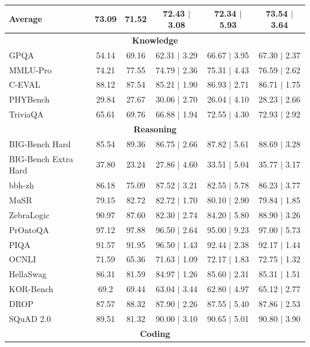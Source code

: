 \begin{table}[htbp]
{\begin{tabular}{lcc|ccc}
\midrule
\textbf{Average}& 73.09 & 71.52 & 72.43 $\mid$ 3.08 & 72.34 $\mid$ 5.93  & 73.54 $\mid$ 3.64 \\
\midrule
\multicolumn{6}{c}{\textbf{Knowledge}} \\
\midrule
GPQA & 54.14 & 69.16 & 62.31 $\mid$ 3.29 & 66.67 $\mid$ 3.95  & 67.30 $\mid$ 2.37 \\
MMLU-Pro & 74.21 & 77.55 & 74.79 $\mid$ 2.36 & 75.31 $\mid$ 4.43  & 76.59 $\mid$ 2.62 \\
C-EVAL & 88.12 & 87.54 & 85.21 $\mid$ 1.90 & 86.93 $\mid$ 2.71  & 86.71 $\mid$ 1.75 \\
PHYBench & 29.84 & 27.67 & 30.06 $\mid$ 2.70 & 26.04 $\mid$ 4.10  & 28.23 $\mid$ 2.66 \\
TriviaQA & 65.61 & 69.76 & 66.88 $\mid$ 1.94 & 72.55 $\mid$ 4.30  & 72.93 $\mid$ 2.92 \\
\midrule
\multicolumn{6}{c}{\textbf{Reasoning}} \\
\midrule
BIG-Bench Hard & 85.54 & 89.36 & 86.75 $\mid$ 2.66 & 87.82 $\mid$ 5.61  & 88.69 $\mid$ 3.28 \\
BIG-Bench Extra Hard & 37.80 & 23.24 & 27.86 $\mid$ 4.60 & 33.51 $\mid$ 5.04 &  35.77 $\mid$ 3.17 \\
bbh-zh & 86.18 & 75.09 & 87.52 $\mid$ 3.21 & 82.55 $\mid$ 5.78  & 86.23 $\mid$ 3.77 \\
MuSR & 79.15 & 82.72 & 82.72 $\mid$ 1.70 & 80.10 $\mid$ 2.90 & 79.84 $\mid$ 1.85 \\
ZebraLogic & 90.97 & 87.60 & 82.30 $\mid$ 2.74 & 84.20 $\mid$ 5.80  & 88.90 $\mid$ 3.26 \\
PrOntoQA & 97.12 & 97.88 & 96.50 $\mid$ 2.64 & 95.00 $\mid$ 9.23  & 97.00 $\mid$ 5.73 \\
PIQA & 91.57 & 91.95 & 96.50 $\mid$ 1.43 & 92.44 $\mid$ 2.38  & 92.17 $\mid$ 1.44 \\
OCNLI & 71.59 & 65.36 & 71.63 $\mid$ 1.09 & 72.17 $\mid$ 1.83  & 72.75 $\mid$ 1.32 \\
HellaSwag & 86.31 & 81.59 & 84.97 $\mid$ 1.26 & 85.60 $\mid$ 2.31  & 85.31 $\mid$ 1.51 \\
KOR-Bench & 69.2 & 69.44 & 63.04 $\mid$ 3.44 & 62.80 $\mid$ 4.97  & 65.12 $\mid$ 2.77 \\
DROP & 87.57 & 88.32 & 87.90 $\mid$ 2.26 & 87.55 $\mid$ 5.40  & 87.86 $\mid$ 2.53 \\
SQuAD 2.0 & 89.51 & 81.32 & 90.00 $\mid$ 3.10 & 90.65 $\mid$ 5.01  & 90.80 $\mid$ 3.90 \\
\midrule
\multicolumn{6}{c}{\textbf{Coding}} \\

\end{tabular}}
\end{table}
